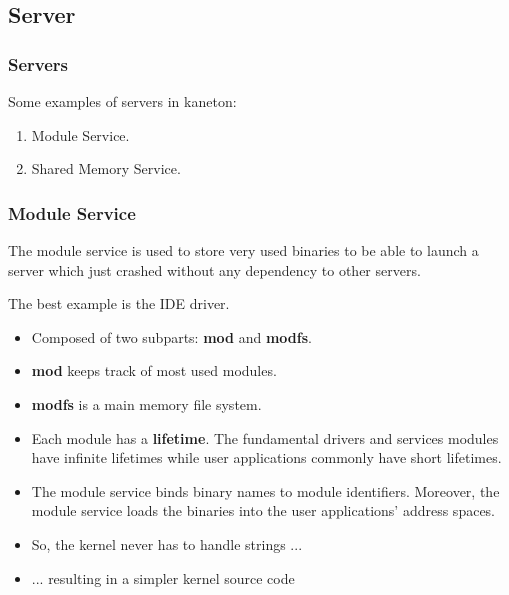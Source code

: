 %
%

\subsection{Server}


\begin{frame}
  \frametitle{Servers}

  Some examples of servers in kaneton:

  \begin{enumerate}[<+->]
    \item
      Module Service.
    \item
      Shared Memory Service.
  \end{enumerate}
\end{frame}


\begin{frame}
  \frametitle{Module Service}

  The module service is used to store very used binaries to be able to
  launch a server which just crashed without any dependency to other servers.

  \nl

  The best example is the IDE driver.

  \nl

  \begin{itemize}[<+->]
    \item
      Composed of two subparts: \textbf{mod} and \textbf{modfs}.
    \item
      \textbf{mod} keeps track of most used modules.
    \item
      \textbf{modfs} is a main memory file system.
    \item
      Each module has a \textbf{lifetime}. The fundamental drivers
      and services modules have infinite lifetimes while user applications
      commonly have short lifetimes.
    \item
      The module service binds binary names to module identifiers.
      Moreover, the module service loads the binaries into the
      user applications' address spaces.
    \item
      So, the kernel never has to handle strings ...
    \item
      ... resulting in a simpler kernel source code
  \end{itemize}
\end{frame}

